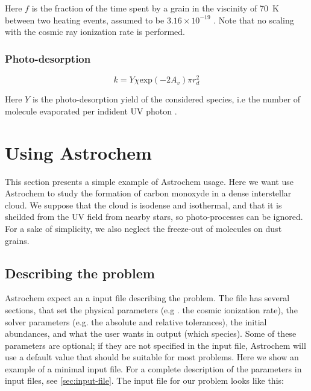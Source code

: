 \documentclass[a4paper,12pt]{article}
\begin{document}
{\noindent
Here $f$ is the fraction of the time spent by a grain in the viscinity
of 70~K between two heating events, assumed to be $3.16 \times
10^{-19}$ \citep{Hasegawa93a}. Note that no scaling with the cosmic
ray ionization rate is performed.

\subsubsection{Photo-desorption}
\label{sec:photo-desorption}

\begin{equation}
  k = Y \chi \mathrm{exp} \left( -2 A_{v} \right) \pi r_{d}^{2}
  \label{eq:photo-desorption}
\end{equation}

\noindent
Here $Y$ is the photo-desorption yield of the considered species, i.e
the number of molecule evaporated per indident UV photon
\citep{dHendecourt85}.

\section{Using Astrochem}
\label{sec:using-astrochem}

This section presents a simple example of Astrochem usage. Here we
want use Astrochem to study the formation of carbon monoxyde in a
dense interstellar cloud. We suppose that the cloud is isodense and
isothermal, and that it is sheilded from the UV field from nearby
stars, so photo-processes can be ignored. For a sake of simplicity, we
also neglect the freeze-out of molecules on dust grains.

\subsection{Describing the problem}
\label{sec:describing-problem}

Astrochem expect an a input file describing the problem. The file has
several sections, that set the physical parameters (e.g . the cosmic
ionization rate), the solver parameters (e.g. the absolute and
relative tolerances), the initial abundances, and what the user wants
in output (which species). Some of these parameters are optional; if
they are not specified in the input file, Astrochem will use a default
value that should be suitable for most problems. Here we show an
example of a minimal input file. For a complete description of the
parameters in input files, see \ref{sec:input-file}. The input file for
our problem looks like this:

}
\end{document}
